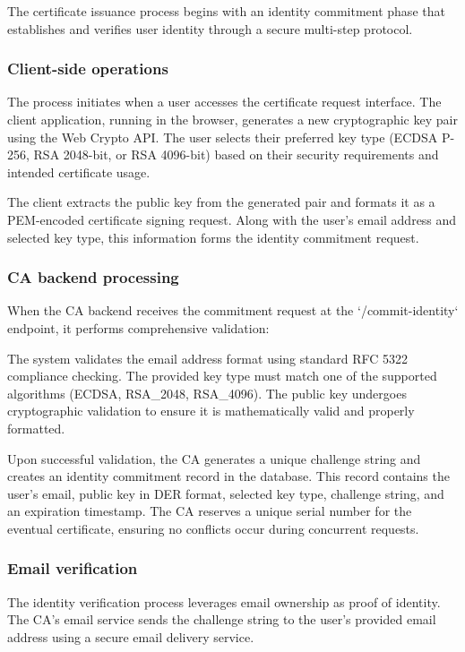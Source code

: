 The certificate issuance process begins with an identity commitment phase that 
establishes and verifies user identity through a secure multi-step protocol.

\subsubsection{Client-side operations}

The process initiates when a user accesses the certificate request interface. 
The client application, running in the browser, generates a new cryptographic 
key pair using the Web Crypto API. The user selects their preferred key type 
(ECDSA P-256, RSA 2048-bit, or RSA 4096-bit) based on their security requirements 
and intended certificate usage.

The client extracts the public key from the generated pair and formats it as 
a PEM-encoded certificate signing request. Along with the user's email address 
and selected key type, this information forms the identity commitment request.

\subsubsection{CA backend processing}

When the CA backend receives the commitment request at the `/commit-identity` 
endpoint, it performs comprehensive validation:

The system validates the email address format using standard RFC 5322 compliance 
checking. The provided key type must match one of the supported algorithms 
(ECDSA, RSA\_2048, RSA\_4096). The public key undergoes cryptographic validation 
to ensure it is mathematically valid and properly formatted.

Upon successful validation, the CA generates a unique challenge string and creates 
an identity commitment record in the database. This record contains the user's 
email, public key in DER format, selected key type, challenge string, and an 
expiration timestamp. The CA reserves a unique serial number for the eventual 
certificate, ensuring no conflicts occur during concurrent requests.

\subsubsection{Email verification}

The identity verification process leverages email ownership as proof of identity. 
The CA's email service sends the challenge string to the user's provided email 
address using a secure email delivery service.

